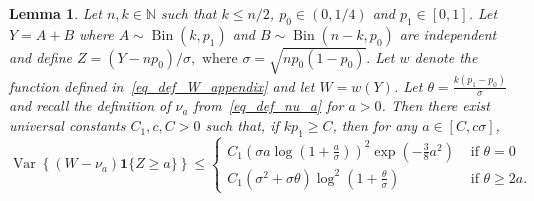 \documentclass{article}
\newcommand{\one}{\mathbf{1}}
\newtheorem{lemma}{Lemma}
\begin{document}
\begin{lemma}\label{lem_variance_trunc_chi2}
Let $n,k \in \mathbb N$ such that $k \leq n/2$, $p_0 \in (0,1/4)$ and $p_1 \in [0,1]$. 
Let $Y = A+B$ where $A \sim \operatorname{Bin}(k,p_1)$ and $B \sim \operatorname{Bin}(n-k,p_0)$ are independent and define 
$Z = (Y-np_0)/\sigma, \text{ where } \sigma = \sqrt{np_0(1-p_0)}.$ 
Let $w$ denote the function defined in~\eqref{eq_def_W_appendix} and let $W = w(Y)$.
Let $\theta = \frac{k(p_1 - p_0)}{\sigma}$ and recall the definition of $\nu_a$ from~\eqref{eq_def_nu_a} for $a > 0$. 
Then there exist universal constants $C_1, c,C>0$ such that, if $kp_1 \geq C$, then for any $a \in [C,c\sigma]$,
$$
\operatorname{Var}\left\{\left(W-\nu_{a}\right) \one{\{Z \geq a\}}\right\} \leq \begin{cases}C_{1} \left( \sigma a \log\left(1+ \frac{a}{\sigma}\right)\right)^2 \exp\left(-\frac{3}{8}a^2\right) & \text { if } \theta=0 \\[5pt]
C_{1} (\sigma^2 + \sigma \theta )\log^2\left(1+\frac{\theta}{\sigma}\right) & \text { if }\theta \geq 2 a.\end{cases}
$$
\end{lemma}
\end{document}
